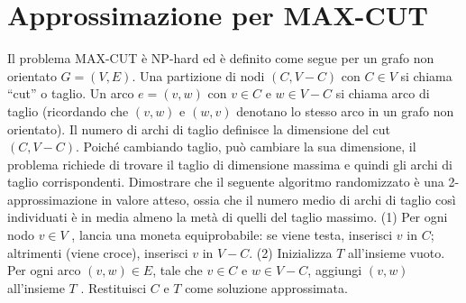 \chapter{Approssimazione per MAX-CUT}

\begin{problem*}
    Il problema MAX-CUT è NP-hard ed è definito come segue per 
    un grafo non orientato $G = (V, E)$. Una partizione di nodi $(C, V - C)$
    con $C \in V$ si chiama “cut” o taglio. Un arco $e = (v, w)$ con $v \in C$
    e $w \in V - C$ si chiama arco di taglio (ricordando che $(v, w)$ e $(w, v)$
    denotano lo stesso arco in un grafo non orientato). Il numero di archi di 
    taglio definisce la dimensione del cut $(C, V - C)$. Poiché cambiando taglio, 
    può cambiare la sua dimensione, il problema richiede di trovare il taglio di 
    dimensione massima e quindi gli archi di taglio corrispondenti. Dimostrare che 
    il seguente algoritmo randomizzato è una 2-approssimazione in valore atteso, 
    ossia che il numero medio di archi di taglio così individuati è in media almeno
    la metà di quelli del taglio massimo. (1) Per ogni nodo $v \in V$ , lancia una 
    moneta equiprobabile: se viene testa, inserisci $v$ in $C$; altrimenti (viene
    croce), inserisci $v$ in $V - C$. (2) Inizializza $T$ all’insieme vuoto. Per 
    ogni arco $(v, w) \in E$, tale che $v \in C$ e $w \in V - C$, aggiungi $(v, w)$
    all’insieme $T$ . Restituisci $C$ e $T$ come soluzione approssimata.
\end{problem*} 
